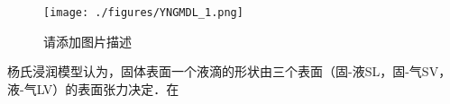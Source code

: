 

\begin{figure}[ht]
\centering
\texttt{[image: ./figures/YNGMDL\_1.png]}
\caption{请添加图片描述} \label{YNGMDL_fig1}
\end{figure}
杨氏浸润模型认为，固体表面一个液滴的形状由三个表面（固-液SL，固-气SV，液-气LV）的表面张力决定．在